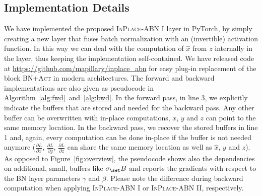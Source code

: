 \documentclass[10pt,twocolumn,letterpaper]{article}
\newcommand{\bnInplace}{\textsc{InPlace-ABN}\xspace}
\begin{document}
\subsection{Implementation Details}\label{ss:implementation}
We have implemented the proposed \bnInplace I layer in PyTorch, by simply creating a new layer that fuses batch normalization with an (invertible) activation function. In this way we can deal with the computation of $\hat x$ from $z$ internally in the layer, thus keeping the implementation self-contained. We have released code at \url{https://github.com/mapillary/inplace_abn} for easy plug-in replacement of the block \textsc{BN+Act} in modern architectures. The forward and backward implementations are also given as pseudocode in Algorithm~\ref{alg:fwd}~and~\ref{alg:bwd}. In the forward pass, in line 3, we explicitly indicate the buffers that are stored and needed for the backward pass. Any other buffer can be overwritten with in-place computations, \eg $x$, $y$ and $z$ can point to the same memory location. In the backward pass, we recover the stored buffers in line 1 and, again, every computation can be done in-place if the buffer is not needed anymore (\eg $\frac{\partial L}{\partial x}$, $\frac{\partial L}{\partial y}$, $\frac{\partial L}{\partial z}$ can share the same memory location as well as $\hat x$, $y$ and $z$). As opposed to Figure~\ref{fig:overview}, the pseudocode shows also the dependencies on additional, small, buffers like $\sigma_\set B$ and reports the gradients with respect to the \textsc{BN} layer parameters $\gamma$ and $\beta$. Please note the difference during backward computation when applying \bnInplace I or \bnInplace II, respectively.
\end{document}
